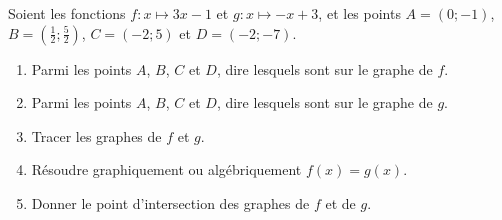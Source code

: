 
\begin{exercice}\label{exosmath-0016}

    Soient les fonctions \( f\colon x\mapsto 3x-1\) et \(g\colon x\mapsto -x+3\), et les points \( A=(0;-1)\), \( B=(\frac{ 1 }{2};\frac{ 5 }{2})\), \( C=(-2;5)\) et \( D=(-2;-7)\).
        \begin{enumerate}
            \item
                Parmi les points \( A\), \( B\), \( C\) et \( D\), dire lesquels sont sur le graphe de \( f\).
            \item
                Parmi les points \( A\), \( B\), \( C\) et \( D\), dire lesquels sont sur le graphe de \( g\).
            \item
                Tracer les graphes de \( f\) et \( g\).
            \item
                Résoudre graphiquement ou algébriquement \( f(x)=g(x)\).
            \item
                Donner le point d'intersection des graphes de \( f\) et de \( g\).
        \end{enumerate}

\end{exercice}
